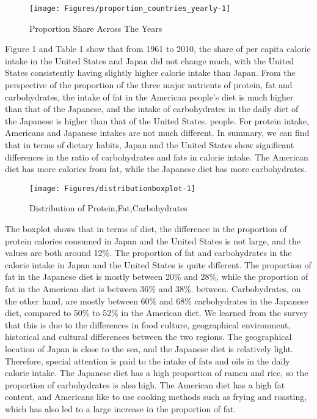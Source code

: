 \documentclass[11pt,a4paper,]{article}
\begin{document}
\begin{figure}[H]
\texttt{[image: Figures/proportion\_countries\_yearly-1]}
\caption{Proportion Share Across The Years}
\label{fig:proportion_countries_yearly}
\end{figure}

Figure 1 and Table 1 show that from 1961 to 2010, the share of per capita calorie intake in the United States and Japan did not change much, with the United States consistently having slightly higher calorie intake than Japan.
From the perspective of the proportion of the three major nutrients of protein, fat and carbohydrates, the intake of fat in the American people's diet is much higher than that of the Japanese, and the intake of carbohydrates in the daily diet of the Japanese is higher than that of the United States. people. For protein intake, Americans and Japanese intakes are not much different.
In summary, we can find that in terms of dietary habits, Japan and the United States show significant differences in the ratio of carbohydrates and fats in calorie intake. The American diet has more calories from fat, while the Japanese diet has more carbohydrates.

\begin{figure}[H]
\texttt{[image: Figures/distributionboxplot-1]}
\caption{Distribution of Protein,Fat,Carbohydrates}
\label{fig:distributionboxplot}
\end{figure}

The boxplot shows that in terms of diet, the difference in the proportion of protein calories consumed in Japan and the United States is not large, and the values are both around 12\%. The proportion of fat and carbohydrates in the calorie intake in Japan and the United States is quite different. The proportion of fat in the Japanese diet is mostly between 20\% and 28\%, while the proportion of fat in the American diet is between 36\% and 38\%. between. Carbohydrates, on the other hand, are mostly between 60\% and 68\% carbohydrates in the Japanese diet, compared to 50\% to 52\% in the American diet.
We learned from the survey that this is due to the differences in food culture, geographical environment, historical and cultural differences between the two regions. The geographical location of Japan is close to the sea, and the Japanese diet is relatively light. Therefore, special attention is paid to the intake of fats and oils in the daily calorie intake. The Japanese diet has a high proportion of ramen and rice, so the proportion of carbohydrates is also high.
The American diet has a high fat content, and Americans like to use cooking methods such as frying and roasting, which has also led to a large increase in the proportion of fat.
\end{document}
